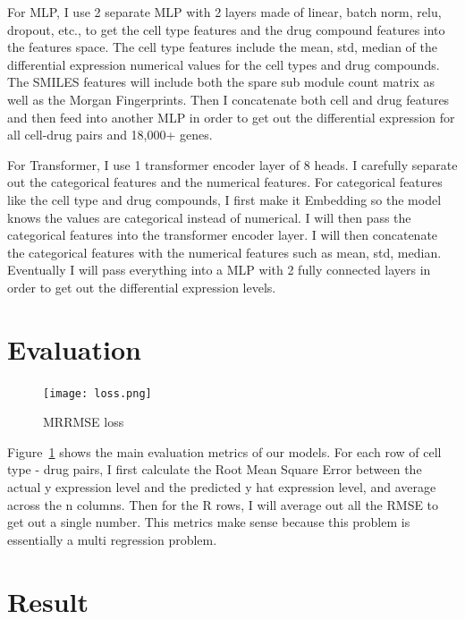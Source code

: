 \documentclass[11pt, oneside]{article}   	%
\begin{document}
For MLP, I use 2 separate MLP with 2 layers made of linear, batch norm, relu, dropout, etc., to get the cell type features and the drug compound features into the features space. The cell type features include the mean, std, median of the differential expression numerical values for the cell types and drug compounds. The SMILES features will include both the spare sub module count matrix as well as the Morgan Fingerprints. Then I concatenate both cell and drug features and then feed into another MLP in order to get out the differential expression for all cell-drug pairs and 18,000+ genes. 

For Transformer, I use 1 transformer encoder layer of 8 heads. I carefully separate out the categorical features and the numerical features. For categorical features like the cell type and drug compounds, I first make it Embedding so the model knows the values are categorical instead of numerical. I will then pass the categorical features into the transformer encoder layer. I will then concatenate the categorical features with the numerical features such as mean, std, median. Eventually I will pass everything into a MLP with 2 fully connected layers in order to get out the differential expression levels. 



\section*{Evaluation}

\begin{figure}[htbp]
  \centering
  \texttt{[image: loss.png]}
  \caption{MRRMSE loss}
  \label{fig:rmse}
\end{figure}

Figure~\ref{fig:rmse} shows the main evaluation metrics of our models. For each row of cell type - drug pairs, I first calculate the Root Mean Square Error between the actual y expression level and the predicted y hat expression level, and average across the n columns. Then for the R rows, I will average out all the RMSE to get out a single number. This metrics make sense because this problem is essentially a multi regression problem. 





\section*{Result}
\end{document}
